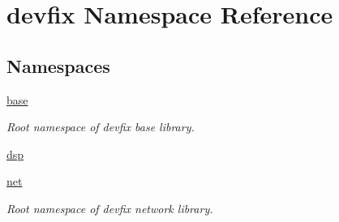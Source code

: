 \hypertarget{namespacedevfix}{}\section{devfix Namespace Reference}
\label{namespacedevfix}
\subsection*{Namespaces}
\begin{DoxyCompactItemize}
\item 
 \hyperlink{namespacedevfix_1_1base}{base}
\begin{DoxyCompactList}\small\item\em Root namespace of devfix base library. \end{DoxyCompactList}\item 
 \hyperlink{namespacedevfix_1_1dsp}{dsp}
\item 
 \hyperlink{namespacedevfix_1_1net}{net}
\begin{DoxyCompactList}\small\item\em Root namespace of devfix network library. \end{DoxyCompactList}\end{DoxyCompactItemize}
